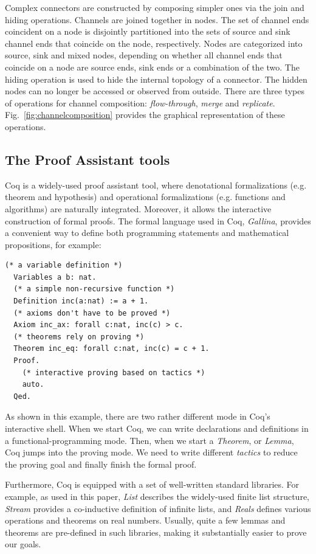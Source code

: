 \documentclass[preprint,3p]{elsarticle}
\begin{document}
Complex connectors are constructed by composing simpler ones via the join and hiding operations. Channels are joined together in nodes. The set of channel ends coincident on a node is disjointly partitioned into the sets of source and sink channel ends that coincide on the node, respectively. Nodes are categorized into source, sink and mixed nodes, depending on whether all channel ends that coincide on a node are source ends, sink ends or a combination of the two. The hiding operation is used to hide the internal topology of a connector. The hidden nodes can no longer be accessed or observed from outside. There are three types of operations for channel composition: \emph{flow-through}, \emph{merge} and \emph{replicate}. Fig.~\ref{fig:channelcomposition} provides the graphical representation of these operations.

\subsection{The Proof Assistant tools}

Coq\cite{huet1997coq} is a widely-used proof assistant tool, where denotational formalizations (e.g.
theorem and hypothesis) and operational formalizations (e.g. functions and algorithms) are naturally
integrated. Moreover, it allows the interactive construction of formal proofs.
The formal language used in Coq, \emph{Gallina}, provides a convenient way to define
both programming statements and mathematical propositions, for example:
\begin{lstlisting}[language=coq]
  (* a variable definition *)
  Variables a b: nat.
  (* a simple non-recursive function *)
  Definition inc(a:nat) := a + 1.
  (* axioms don't have to be proved *)
  Axiom inc_ax: forall c:nat, inc(c) > c.
  (* theorems rely on proving *)
  Theorem inc_eq: forall c:nat, inc(c) = c + 1.
  Proof.
    (* interactive proving based on tactics *)
    auto.
  Qed.
\end{lstlisting}

As shown in this example, there are two rather different mode in Coq's interactive shell. When
we start Coq, we can write declarations and definitions in a functional-programming mode. Then, when
we start a \emph{Theorem}, or \emph{Lemma}, Coq jumps into the proving mode. We need to write
different \emph{tactics} to reduce the proving goal and finally finish the formal proof.

Furthermore, Coq is equipped with a set of well-written standard libraries. For example, as used in
this paper, \emph{List} describes the widely-used finite list structure, \emph{Stream} provides a co-inductive
definition of infinite lists, and \emph{Reals} defines various operations and theorems on real
numbers. Usually, quite a few lemmas and theorems are pre-defined in such libraries, making it
substantially easier to prove our goals.
\end{document}
